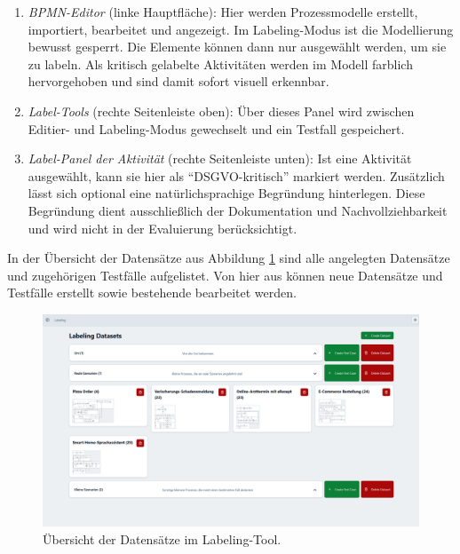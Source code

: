 \begin{enumerate}
    \item \emph{BPMN-Editor} (linke Hauptfläche): Hier werden Prozessmodelle erstellt, importiert, bearbeitet und angezeigt. Im Labeling-Modus ist die Modellierung bewusst gesperrt. Die Elemente können dann nur ausgewählt werden, um sie zu labeln. Als kritisch gelabelte Aktivitäten werden im Modell farblich hervorgehoben und sind damit sofort visuell erkennbar.
    \item \emph{Label-Tools} (rechte Seitenleiste oben): Über dieses Panel wird zwischen Editier- und Labeling-Modus gewechselt und ein Testfall gespeichert.
    \item \emph{Label-Panel der Aktivität} (rechte Seitenleiste unten): Ist eine Aktivität ausgewählt, kann sie hier als \enquote{DSGVO-kritisch} markiert werden. Zusätzlich lässt sich optional eine natürlichsprachige Begründung hinterlegen. Diese Begründung dient ausschließlich der Dokumentation und Nachvollziehbarkeit und wird nicht in der Evaluierung berücksichtigt.
\end{enumerate}

In der Übersicht der Datensätze aus Abbildung \ref{fig:labeling-datasets} sind alle angelegten Datensätze und zugehörigen Testfälle aufgelistet. Von hier aus können neue Datensätze und Testfälle erstellt sowie bestehende bearbeitet werden.

\begin{figure}
    \centering
    \includegraphics[width=\textwidth]{images/labeling/labeling-datasets}
    \caption{Übersicht der Datensätze im Labeling-Tool.}
    \label{fig:labeling-datasets}
\end{figure}
